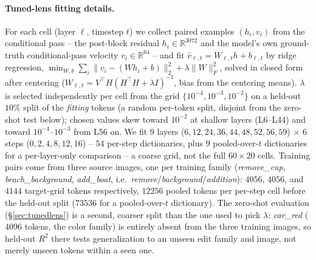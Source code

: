 \documentclass[10pt,twocolumn,letterpaper]{article}
\begin{document}
\paragraph{Tuned-lens fitting details.} For each cell (layer $\ell$,
timestep $t$) we collect paired examples $(h_i,v_i)$ from the
conditional pass -- the post-block residual $h_i\in\mathbb{R}^{3072}$
and the model's own ground-truth conditional-pass velocity
$v_i\in\mathbb{R}^{64}$ -- and fit $\hat v_{\ell,t}=W_{\ell,t}h+b_{\ell,t}$
by ridge regression, $\min_{W,b}\sum_i\lVert
v_i-(Wh_i+b)\rVert_2^2+\lambda\lVert W\rVert_F^2$, solved in closed
form after centering ($W_{\ell,t}=V^\top H(H^\top H+\lambda I)^{-1}$,
bias from the centering means). $\lambda$ is selected independently
per cell from the grid $\{10^{-4},10^{-3},10^{-2}\}$ on a held-out
$10\%$ split of the \emph{fitting} tokens (a random per-token split,
disjoint from the zero-shot test below); chosen values skew toward
$10^{-2}$ at shallow layers (L6--L44) and toward $10^{-4}$--$10^{-3}$
from L56 on. We fit $9$ layers ($6,12,24,36,44,48,52,56,59$) $\times$
$6$ steps ($0,2,4,8,12,16$) -- $54$ per-step dictionaries, plus $9$
pooled-over-$t$ dictionaries for a per-layer-only comparison -- a
coarse grid, not the full $60{\times}20$ cells. Training pairs come
from three source images, one per training family (\emph{remove\_cup},
\emph{beach\_background}, \emph{add\_boat}, i.e.\
\emph{remove}/\emph{background}/\emph{addition}): $4056$, $4056$, and
$4144$ target-grid tokens respectively, $12256$ pooled tokens per
per-step cell before the held-out split ($73536$ for a pooled-over-$t$
dictionary). The zero-shot evaluation (\S\ref{sec:tunedlens}) is a
second, coarser split than the one used to pick $\lambda$:
\emph{car\_red} ($4096$ tokens, the color family) is entirely absent
from the three training images, so held-out $R^2$ there tests
generalization to an unseen edit family and image, not merely unseen
tokens within a seen one.
\end{document}
